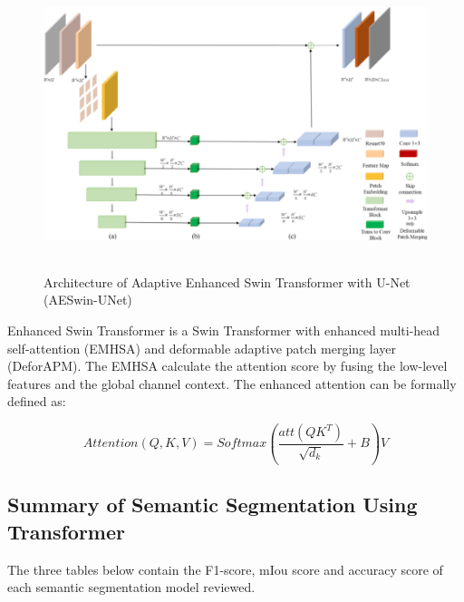 \FloatBarrier
\begin{figure}[ht]
\includegraphics[width=12.5cm, height=8.5cm]{images/unet-trasnformer.jpg}
\centering
\caption{Architecture of Adaptive Enhanced Swin Transformer with U-Net (AESwin-UNet) \protect\cite{unet-transformer}}
\label{fig:unetswin}
\end{figure}

Enhanced Swin Transformer is a Swin Transformer  with enhanced multi-head self-attention (EMHSA) and deformable adaptive patch merging layer (DeforAPM). The EMHSA calculate  the attention score by fusing the low-level features and the global channel context. The enhanced attention can be formally defined as:

\begin{equation}
    Attention(Q,K,V) = Softmax(\frac{att(QK^{T})}{\sqrt{d_k}}+B)V
\end{equation}

\subsection{Summary of Semantic Segmentation Using Transformer}

The three tables below contain the F1-score, mIou score and accuracy score of each semantic segmentation model reviewed.

